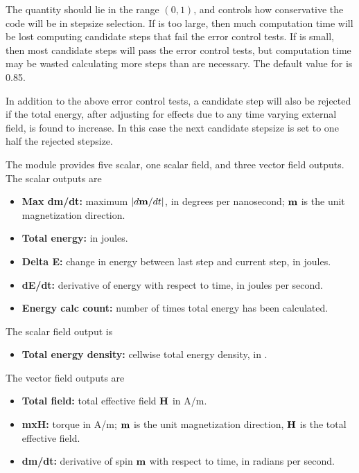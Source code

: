 \begin{description}
The  quantity should lie in the range $(0,1)$, and controls
how conservative the code will be in stepsize selection.  If 
is too large, then much computation time will be lost computing
candidate steps that fail the error control tests.  If  is
small, then most candidate steps will pass the error control tests, but
computation time may be wasted calculating more steps than are
necessary.  The default value for  is 0.85.

In addition to the above error control tests, a candidate step will also
be rejected if the total energy, after adjusting for effects due to any
time varying external field, is found to increase.  In this case the
next candidate stepsize is set to one half the rejected stepsize.

The  module provides five scalar, one scalar
field, and three vector field outputs.  The scalar outputs are
\begin{itemize}
\item \textbf{Max dm/dt:} maximum $|d\textbf{m}/dt|$, in degrees per
   nanosecond; $\textbf{m}$ is the unit magnetization direction.
\item \textbf{Total energy:} in joules.
\item \textbf{Delta E:} change in energy between last step and current
   step, in joules.
\item \textbf{dE/dt:} derivative of energy with respect to time, in
   joules per second.
\item \textbf{Energy calc count:} number of times total energy has been
   calculated.
\end{itemize}

The scalar field output is
\begin{itemize}
\item \textbf{Total energy density:} cellwise total energy density, in
.
\end{itemize}

The vector field outputs are
\begin{itemize}
\item \textbf{Total field:} total effective field $\textbf{H}$ in A/m.
\item \textbf{mxH:} torque in A/m; $\textbf{m}$ is the unit magnetization
   direction, $\textbf{H}$ is the total effective field.
\item \textbf{dm/dt:} derivative of spin $\textbf{m}$ with respect to time, in
   radians per second.
\end{itemize}


\end{description}
